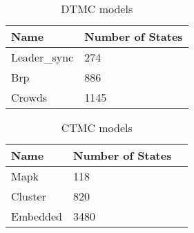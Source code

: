 \begin{table}[!htb]
    \centering
    \caption{DTMC models}
    \label{tab:dtmc_models}
    \begin{tabular}{ll}
        \toprule
        Name         & Number of States \\
        \midrule
        Leader\_sync & 274              \\
        Brp          & 886              \\
        Crowds       & 1145             \\
        \bottomrule
    \end{tabular}
\end{table}

\begin{table}[!htb]
    \centering
    \caption{CTMC models}
    \label{tab:ctmc_models}
    \begin{tabular}{lll}
        \toprule
        Name     & Number of States \\
        \midrule
        Mapk     & 118              \\
        Cluster  & 820              \\
        Embedded & 3480             \\
        \bottomrule
    \end{tabular}
\end{table}




